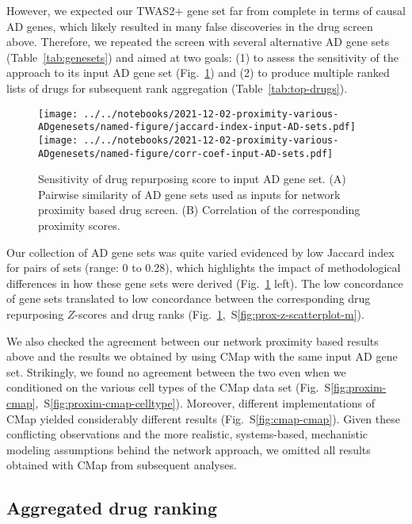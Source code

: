 \documentclass[letterpaper]{article}
\begin{document}
However, we expected our TWAS2+ gene set far from complete in terms of
causal AD genes, which likely resulted in many false discoveries in the
drug screen above.  Therefore, we repeated the screen with several alternative AD gene
sets (Table~\ref{tab:genesets}) and aimed at two goals: (1) to assess the
sensitivity of the approach to its input AD gene set
(Fig.~\ref{fig:divergent-results}) and (2) to produce multiple ranked lists of
drugs for subsequent rank aggregation (Table~\ref{tab:top-drugs}).

\begin{figure}
\texttt{[image: ../../notebooks/2021-12-02-proximity-various-ADgenesets/named-figure/jaccard-index-input-AD-sets.pdf]}
\texttt{[image: ../../notebooks/2021-12-02-proximity-various-ADgenesets/named-figure/corr-coef-input-AD-sets.pdf]}
\caption{
  Sensitivity of drug repurposing score to input AD gene set. (A) Pairwise
  similarity of AD gene sets used as inputs for network proximity based drug
  screen.  (B) Correlation of the corresponding proximity scores.
}
\label{fig:divergent-results}
\end{figure}

Our collection of AD gene sets was quite varied evidenced by low Jaccard index
for pairs of sets (range: 0 to 0.28), which
highlights the impact of methodological differences in how these gene sets
were derived (Fig.~\ref{fig:divergent-results} left). The low concordance of
gene sets translated to low concordance between the corresponding drug
repurposing $Z$-scores and drug ranks
(Fig.~\ref{fig:divergent-results},~S\ref{fig:prox-z-scatterplot-m}).

We also checked the agreement between our network proximity based results
above and the results we obtained by using CMap with the same input AD gene
set.  Strikingly, we found no agreement between the two even when we
conditioned on the various cell types of the CMap data set
(Fig.~S\ref{fig:proxim-cmap},~S\ref{fig:proxim-cmap-celltype}).  Moreover,
different implementations of CMap yielded considerably different results
(Fig.~S\ref{fig:cmap-cmap}).  Given these conflicting observations and the more realistic,
systems-based, mechanistic modeling assumptions behind the network approach,
we omitted all results obtained with CMap from subsequent analyses.

\subsection{Aggregated drug ranking}
\end{document}
